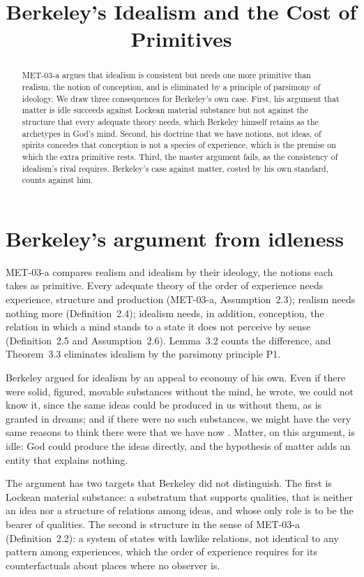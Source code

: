 \documentclass{situationist-preprint}
\title{Berkeley's Idealism and the Cost of Primitives}
\begin{document}
\maketitle

\begin{abstract}
MET-03-a argues that idealism is consistent but needs one more primitive than realism, the notion of conception, and is eliminated by a principle of parsimony of ideology. We draw three consequences for Berkeley's own case. First, his argument that matter is idle succeeds against Lockean material substance but not against the structure that every adequate theory needs, which Berkeley himself retains as the archetypes in God's mind. Second, his doctrine that we have notions, not ideas, of spirits concedes that conception is not a species of experience, which is the premise on which the extra primitive rests. Third, the master argument fails, as the consistency of idealism's rival requires. Berkeley's case against matter, costed by his own standard, counts against him.
\end{abstract}

\section{Berkeley's argument from idleness}

MET-03-a compares realism and idealism by their ideology, the notions each takes as primitive. Every adequate theory of the order of experience needs experience, structure and production (MET-03-a, Assumption~2.3); realism needs nothing more (Definition~2.4); idealism needs, in addition, conception, the relation in which a mind stands to a state it does not perceive by sense (Definition~2.5 and Assumption~2.6). Lemma~3.2 counts the difference, and Theorem~3.3 eliminates idealism by the parsimony principle P1.

Berkeley argued for idealism by an appeal to economy of his own. Even if there were solid, figured, movable substances without the mind, he wrote, we could not know it, since the same ideas could be produced in us without them, as is granted in dreams; and if there were no such substances, we might have the very same reasons to think there were that we have now \citep[\S\S 18--20]{BerkeleyPrinciples}. Matter, on this argument, is idle: God could produce the ideas directly, and the hypothesis of matter adds an entity that explains nothing.

The argument has two targets that Berkeley did not distinguish. The first is Lockean material substance: a substratum that supports qualities, that is neither an idea nor a structure of relations among ideas, and whose only role is to be the bearer of qualities. The second is structure in the sense of MET-03-a (Definition~2.2): a system of states with lawlike relations, not identical to any pattern among experiences, which the order of experience requires for its counterfactuals about places where no observer is.
\end{document}
